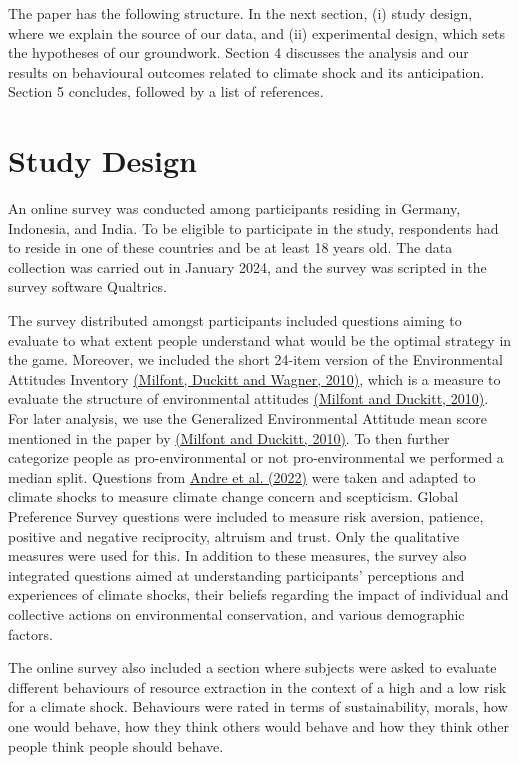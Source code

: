 \documentclass[11pt, a4paper, leqno]{article}
\begin{document}
The paper has the following structure. In the next section, (i) study design, where we explain the source of our data, and (ii) experimental design, which sets the hypotheses of our groundwork. Section 4 discusses the analysis and our results on behavioural outcomes related to climate shock and its anticipation. Section 5 concludes, followed by a list of references.




 \section{Study Design} %
\label{Study Design}
An online survey was conducted among participants residing in Germany, Indonesia, and India. To be eligible to participate in the study, respondents had to reside in one of these countries and be at least 18 years old. The data collection was carried out in January 2024, and the survey was scripted in the survey software Qualtrics. 

The survey distributed amongst participants included questions aiming to evaluate to what extent people understand what would be the optimal strategy in the game. Moreover, we included the short 24-item version of the Environmental Attitudes Inventory \href{https://api.semanticscholar.org/CorpusID:59149978}{ (Milfont, Duckitt and Wagner, 2010)}, which is a measure to evaluate the structure of environmental attitudes \href{https://doi.org/10.1016/j.jenvp.2009.09.001}{(Milfont and Duckitt, 2010)}. For later analysis, we use the Generalized Environmental Attitude mean score mentioned in the paper by \href{https://doi.org/10.1016/j.jenvp.2009.09.001}{(Milfont and Duckitt, 2010)}. To then further categorize people as pro-environmental or not pro-environmental we performed a median split.
Questions from \href{https://api.semanticscholar.org/CorpusID:261216513}{Andre et al. (2022)} were taken and adapted to climate shocks to measure climate change concern and scepticism. Global Preference Survey questions were included to measure risk aversion, patience, positive and negative reciprocity, altruism and trust. Only the qualitative measures were used for this. 
In addition to these measures, the survey also integrated questions aimed at understanding participants' perceptions and experiences of climate shocks, their beliefs regarding the impact of individual and collective actions on environmental conservation, and various demographic factors.
\medskip

The online survey also included a section where subjects were asked to evaluate different behaviours of resource extraction in the context of a high and a low risk for a climate shock. Behaviours were rated in terms of sustainability, morals, how one would behave, how they think others would behave and how they think other people think people should behave.
\end{document}
